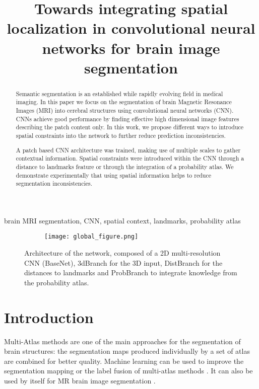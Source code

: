\documentclass{article}
\title{Towards integrating spatial localization in convolutional neural networks for brain image segmentation}
\begin{document}
\maketitle
\begin{abstract}
Semantic segmentation is an established while rapidly evolving field in medical imaging.
In this paper we focus on the segmentation of brain Magnetic Resonance Images (MRI) into cerebral structures using convolutional neural networks (CNN). CNNs achieve good performance by finding effective high dimensional image features describing the patch content only. In this work, we propose different ways to introduce spatial constraints into the network to further reduce prediction inconsistencies.

A patch based CNN architecture was trained, making use of multiple scales to gather contextual information.
Spatial constraints were introduced within the CNN through a distance to landmarks feature or through the integration of a probability atlas.
We demonstrate experimentally that using spatial information helps to reduce segmentation inconsistencies.

\end{abstract}
\begin{keywords}
brain MRI segmentation, CNN, spatial context, landmarks, probability atlas
\end{keywords}

\begin{figure*}[!h]
  \begin{subfigure}{1\linewidth}
  	\centering
    \texttt{[image: global\_figure.png]}
  \end{subfigure}
  \caption{Architecture of the network, composed of a 2D multi-resolution CNN (BaseNet), 3dBranch for the 3D input, DistBranch for the distances to landmarks and ProbBranch to integrate knowledge from the probability atlas.}
  \label{fig:cnnarch}
\end{figure*}

\section{Introduction}
\label{sec:intro}
Multi-Atlas methods\cite{HECKEMANN2006115, mindboogle} are one of the main approaches for the segmentation of brain structures: the segmentation maps produced individually by a set of atlas are combined for better quality. Machine learning can be used to improve the segmentation mapping or the label fusion of multi-atlas methods \cite{SDIK-15b,wang2013multi}. It can also be used by itself for MR brain image segmentation \cite{Stollenga:2015:PML:2969442.2969574,DBLP:journals/corr/RoyCSKNW17,moeskops_automatic_2016}. \newline
\end{document}
